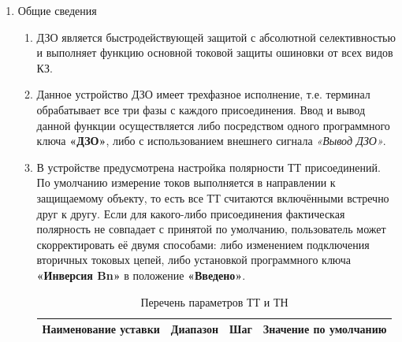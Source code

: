 \color{black}

\begin{enumerate}[label=\arabic{section}.\arabic{subsection}.\arabic{enumi}, labelsep=4pt, leftmargin=0pt, itemindent=57pt, itemsep=0pt, parsep=5pt] %

\item Общие сведения

\begin{enumerate}[label=\arabic{section}.\arabic{subsection}.\arabic{enumi}.\arabic*, labelsep=4pt, leftmargin=0em, itemindent=65pt, parsep=0pt]

\item
ДЗО является быстродействующей защитой с абсолютной селективностью и выполняет функцию
основной токовой защиты ошиновки от всех видов КЗ.

\item
Данное устройство ДЗО имеет трехфазное исполнение, т.е. терминал обрабатывает все три фазы с
каждого присоединения. Ввод и вывод данной функции осуществляется либо посредством одного
программного ключа \textbf{«ДЗО»}, либо с использованием внешнего сигнала \textit{«Вывод ДЗО»}.

\item
В устройстве предусмотрена настройка полярности ТТ присоединений. По умолчанию измерение токов
выполняется в направлении к защищаемому объекту, то есть все ТТ считаются включёнными встречно друг к
другу. Если для какого-либо присоединения фактическая полярность не совпадает с принятой по умолчанию,
пользователь может скорректировать её двумя способами: либо изменением подключения вторичных токовых
цепей, либо установкой программного ключа \textbf{«Инверсия Bn»} в положение \textbf{«Введено»}.

\small
\begin{longtable}{|>{\centering\arraybackslash}m{6.4cm}|>{\centering\arraybackslash}m{4cm}|>{\centering\arraybackslash}m{2.8cm}|>{\centering\arraybackslash}m{2.8cm}|}
\caption{Перечень параметров ТТ и ТН\hfill\vspace{-0.5\baselineskip}}\label{dzo:tbl1}\\
\hline
\rowcolor{gray!30}
Наименование уставки & Диапазон & Шаг & Значение по умолчанию \\
\hline
\endfirsthead


\end{longtable}
\end{enumerate}
\end{enumerate}
